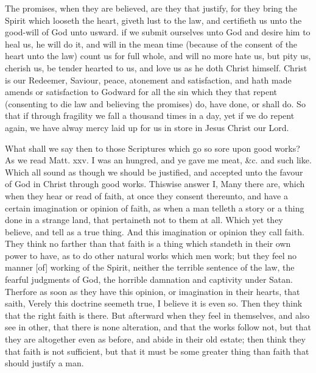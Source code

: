 \documentclass{custom}
\begin{document}
The promises, when they are believed, are they that
justify, for they bring the Spirit which looseth the heart, 
giveth lust to the law, and certifieth us unto the good-will 
of God unto usward. if we submit ourselves unto God 
and desire him to heal us, he will do it, and will in the 
mean time (because of the consent of the heart unto the 
law) count us for full whole, and will no more hate us, but 
pity us, cherish us, be tender hearted to us, and love us as 
he doth Christ himself. Christ is our Redeemer, Saviour, 
peace, atonement and satisfaction, and hath made amends 
or satisfaction to Godward for all the sin which they that 
repent (consenting to die law and believing the promises) 
do, have done, or shall do. So that if through fragility 
we fall a thousand times in a day, yet if we do repent 
again, we have alway mercy laid up for us in store in Jesus 
Christ our Lord. 


What shall we say then to those Scriptures which go so 
sore upon good works? As we read Matt. xxv. I was 
an hungred, and ye gave me meat, \&c. and such like. 
Which all sound as though we should be justified, and
accepted unto the favour of God in Christ through good 
works. Thiswise answer I, Many there are, which when 
they hear or read of faith, at once they consent thereunto, 
and have a certain imagination or opinion of faith, as when 
a man telleth a story or a thing done in a strange land, that 
pertaineth not to them at all. Which yet they believe, and 
tell as a true thing. And this imagination or opinion they 
call faith. They think no farther than that faith is a thing 
which standeth in their own power to have, as to do other
natural works which men work; but they feel no manner 
[of] working of the Spirit, neither the terrible sentence 
of the law, the fearful judgments of God, the horrible 
damnation and captivity under Satan. Therfore as soon 
as they have this opinion, or imagination in their hearts, 
that saith, Verely this doctrine seemeth true, I believe it is 
even so. Then they think that the right faith is there. 
But afterward when they feel in themselves, and also see in 
other, that there is none alteration, and that the works 
follow not, but that they are altogether even as before, and 
abide in their old estate; then think they that faith is not 
sufficient, but that it must be some greater thing than faith 
that should justify a man. 
\end{document}
